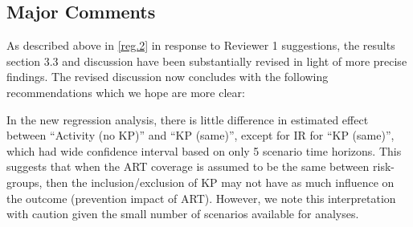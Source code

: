 \subsection{Major Comments}
\begin{comment}\label{recommend}
It's not immediately clear to me what the key recommendation is that flows from Figure 3. If I have a model with the base case (no risk heterogeneity), which compartments or dynamics should I add first better to represent the true epidemic?
\end{comment}
\begin{response}
As described above in \ref{reg.2} in response to Reviewer 1 suggestions, the results section 3.3 and discussion have been
substantially revised in light of more precise findings.
The revised discussion now concludes with the following recommendations which we hope are more clear:
\end{response}
\begin{comment}\label{risk.explain}
Further discussion of the headline finding would be welcome - that the omission of key populations but the inclusion of risk heterogeneity in the generalised population brings about the smallest declines in new HIV infections is notable. Where possible - interrogating which dynamics are most important in the discrepancy between 'Activity (no KP)' and the other three model scenarios would be of interest.
\end{comment}
\begin{response}
In the new regression analysis, there is little difference in estimated effect between ``Activity (no KP)'' and ``KP (same)'',
except for IR for ``KP (same)'', which had wide confidence interval based on only 5 scenario time horizons. This suggests that when the ART coverage is
assumed to  be the same between risk-groups, then the inclusion/exclusion of KP may not have as much influence on the outcome (prevention impact of ART). However, we note this interpretation with caution given the small number of scenarios available for analyses.
\end{response}

